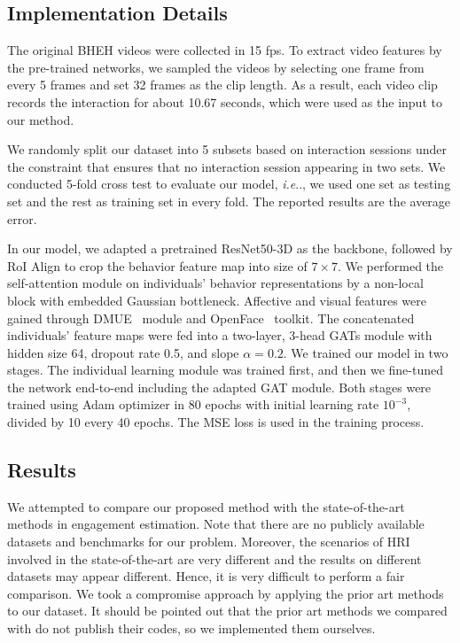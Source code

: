 \documentclass[VANCOUVER,STIX1COL]{WileyNJD-v2}
\makeatletter
\DeclareRobustCommand\onedot{\futurelet\@let@token\@onedot}
\def\@onedot{\ifx\@let@token.\else.\null\fi\xspace}
\def\ie{\emph{i.e}\onedot}
\makeatother
\begin{document}
\subsection{Implementation Details}
\label{subs:Implementation_Details}

The original BHEH videos were collected in 15 fps. To extract video features by the pre-trained networks, we sampled the videos by selecting one frame from every 5 frames and set 32 frames as the clip length. As a result, each video clip records the interaction for about 10.67 seconds, which were used as the input to our method.

We randomly split our dataset into 5 subsets based on interaction sessions under the constraint that ensures that no interaction session appearing in two sets. We conducted 5-fold cross test to evaluate our model, \ie, we used one set as testing set and the rest as training set in every fold. The reported results are the average error.

In our model, we adapted a pretrained ResNet50-3D as the backbone, followed by RoI Align to crop the behavior feature map into size of $7\times7$. We performed the self-attention module on individuals' behavior representations by a non-local block with embedded Gaussian bottleneck. Affective and visual features were gained through DMUE~\cite{She2021Dive} module and OpenFace~\cite{Baltrusaitis2018OpenFace} toolkit. The concatenated individuals' feature maps were fed into a two-layer, 3-head GATs module with hidden size 64, dropout rate 0.5, and slope $\alpha = 0.2$. We trained our model in two stages. The individual learning module was trained first, and then we fine-tuned the network end-to-end including the adapted GAT module. Both stages were trained using Adam optimizer in 80 epochs with initial learning rate $10^{-3}$, divided by 10 every 40 epochs. The MSE loss is used in the training process.

\subsection{Results}
\label{subs:Main_Results}

We attempted to compare our proposed method with the state-of-the-art methods in engagement estimation. Note that there are no publicly available datasets and benchmarks for our problem. Moreover, the scenarios of HRI involved in the state-of-the-art are very different and the results on different datasets may appear different. Hence, it is very difficult to perform a fair comparison. We took a compromise approach by applying the prior art methods to our dataset. It should be pointed out that the prior art methods we compared with do not publish their codes, so we implemented them ourselves.
\end{document}
